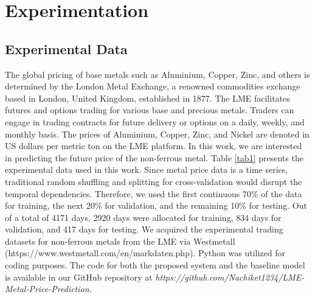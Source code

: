 \documentclass[preprint,12pt]{elsarticle}
\begin{document}
\section{Experimentation}

\subsection{Experimental Data}
The global pricing of base metals such as Aluminium, Copper, Zinc, and others is determined by the London Metal Exchange, a renowned commodities exchange based in London, United Kingdom, established in 1877. The LME facilitates futures and options trading for various base and precious metals. Traders can engage in trading contracts for future delivery or options on a daily, weekly, and monthly basis. The prices of Aluminium, Copper, Zinc, and Nickel are denoted in US dollars per metric ton on the LME platform. In this work, we are interested in predicting the future price of the non-ferrous metal. Table \ref{tab1} presents the experimental data used in this work. Since metal price data is a time series, traditional random shuffling and splitting for cross-validation would disrupt the temporal dependencies. Therefore, we used the first continuous 70\% of the data for training, the next 20\% for validation, and the remaining 10\% for testing. Out of a total of 4171 days, 2920 days were allocated for training, 834 days for validation, and 417 days for testing. We acquired the experimental trading datasets for non-ferrous metals from the LME via Westmetall (https://www.westmetall.com/en/markdaten.php). Python was utilized for coding purposes. The code for both the proposed system and the baseline model is available in our GitHub repository at \textit{https://github.com/Nachiket1234/LME-Metal-Price-Prediction}.
\end{document}
